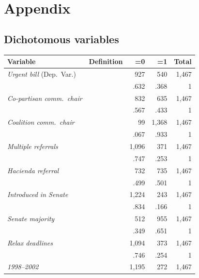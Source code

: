 \documentclass[letter,12pt]{article}
\begin{document}
\section{Appendix}

\subsection{Dichotomous variables}

\begin{footnotesize}

\begin{tabular}{llrrr}
 Variable                      & Definition &       =0 &       =1 & Total  \\ \hline
\emph{Urgent bill} (Dep.~Var.) &     &    927 &   540 & 1,467 \\ [-.75ex]
                               &     &   .632 &  .368 &   1   \\
\emph{Co-partisan comm.~chair} &     &    832 &   635 & 1,467 \\ [-.75ex]
                               &     &   .567 &  .433 &   1   \\
\emph{Coalition comm.~chair}   &     &     99 & 1,368 & 1,467 \\ [-.75ex]
                               &     &   .067 &  .933 &   1   \\
\emph{Multiple referrals}      &     &  1,096 &   371 & 1,467 \\ [-.75ex]
                               &     &   .747 &  .253 &   1   \\
\emph{Hacienda referral}       &     &    732 &   735 & 1,467 \\ [-.75ex]
                               &     &   .499 &  .501 &   1   \\
\emph{Introduced in Senate}    &     &  1,224 &   243 & 1,467 \\ [-.75ex]
                               &     &   .834 &  .166 &   1   \\
\emph{Senate majority}         &     &    512 &   955 & 1,467 \\ [-.75ex]
                               &     &   .349 &  .651 &   1   \\
\emph{Relax deadlines}         &     &  1,094 &   373 & 1,467 \\ [-.75ex]
                               &     &   .746 &  .254 &   1   \\
\emph{1998--2002}              &     &  1,195 &   272 & 1,467 \\ [-.75ex]

\end{tabular}
\end{footnotesize}
\end{document}
